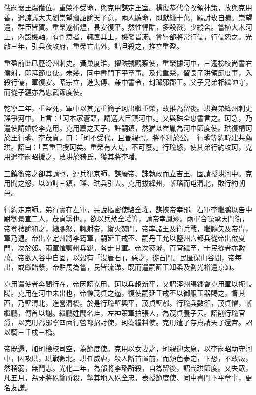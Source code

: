 \begin{pinyinscope}
 俄嗣襄王煴僭位，重榮不受命，與克用謀定王室。楊復恭代令孜領神策，故與克用善，遣諫議大夫劉崇望齎詔諭天子意，兩人聽命，即獻縑十萬，願討玫自贖。崇望還，群臣皆賀。重榮遂斬煴，長安復平。然性悍酷，多殺戮，少縱舍。嘗植大木河上，內設機軸，有忤意者，輒置其上，機發皆溺。嘗辱部將常行儒，行儒怨之。光啟三年，引兵夜攻府，重榮亡出外，詰旦殺之，推立重盈。



 重盈前此已歷汾州刺史。黃巢度淮，擢陜虢觀察使，重榮據河中，三遷檢校尚書右僕射，即拜節度使。未幾，同中書門下平章事。及代重榮，留長子珙領節度事，入殺行儒，軍復安。昭宗立，進太傅、兼中書令，封瑯邪郡王。父子兄弟相繼帥守，而從子蘊亦為忠武節度使。



 乾寧二年，重盈死，軍中以其兄重簡子珂出繼重榮，故推為留後。珙與弟絳州刺史瑤爭河中，上言：「珂本家蒼頭，請選大臣鎮河中。」又與硃全忠書言之。珂急，乃遣使請婚於李克用。克用薦之天子，許嗣鎮，然猶以崔胤為河中節度使。珙復構珂於王行瑜、李茂貞，曰：「珂不受代，且晉親也，將不利於公。」行瑜等約韓建共薦珙。詔曰：「吾重已授珂矣。重榮有大功，不可廢。」行瑜怒，使其弟行約攻珂，克用遣李嗣昭援之，敗珙於猗氏，獲其將李璠。



 三鎮銜帝之卻其請也，連兵犯京師，謀廢帝、誅執政而立吉王，固請授珙河中。克用聞之怒，以師討三鎮，瑤、珙兵引去。克用拔絳州，斬瑤而屯渭北，敗行約朝邑。



 行約走京師。弟行實在左軍，共說樞密使駱全瓘，謀挾帝幸邠。右軍李繼鵬以告中尉劉景宣二人，茂貞黨也。，欲以兵劫全瓘等，請帝幸鳳翔。兩軍合噪承天門街，帝登樓諭和之，繼鵬怒，輒射帝，縱火焚門，帝率諸王及衛兵戰，繼鵬矢及帝胄，軍乃退。帝出幸定州將李筠軍，嗣延王戒丕、嗣丹王允以鹽州六都兵從帝出啟夏門，次於郊。兩軍憚鹽州兵銳，各走其軍。帝次莎城，百官繼至，士民從者亦數萬。帝欲入谷中自固，以穀有「沒唐石」，惡之，徙石門。民匿保山谷間，帝每出，或獻飴漿，帝駐馬為嘗，民皆流涕。既而遣嗣薛王知柔及劉光裕還京師。



 克用遣使者奔問行在，帝因詔克用、珂以兵趨新平，又詔涇州張鐇會克用軍以扼岐陽。克用在河中未出也，帝懼茂貞之逼，復使嗣延王戒丕以御服玉器賜之，督其西，乃壁渭北，進營渭橋。於是行瑜壁興平，茂貞壁鄠。行瑜兵數卻，茂貞懼，斬繼鵬，傳首以謝。繼鵬姓閻名珪，左神策軍拍張人，為茂貞養子云。詔削行瑜官爵，以克用為邠寧四面行營都招討使，珂為糧料使。克用遣子存貞請天子還宮。詔以騎三千戍三橋。



 帝既還，加珂檢校司空，為節度使。克用以女妻之，珂親迎太原，以李嗣昭助守河中，因攻珙，珙戰數北。珙任威虐，殺人斷首置前，而顏色泰定，下恐，不敢叛，然稍弱，無鬥志。光化二年，為部將李璠所殺，自為留後，詔代珙節度。又失眾，凡五月，為牙將硃簡所殺，挈其地入硃全忠，表授節度使、同中書門下平章事，更名友謙。




\end{pinyinscope}
